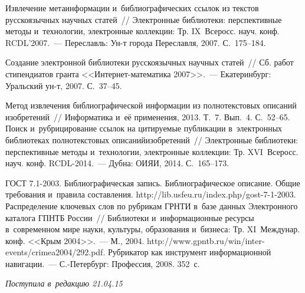 \begin{multicols}{2}
{{\begin{thebibliography}{99}
 Извлечение метаинформации и~библиографических ссылок из текстов русскоязычных научных статей~// Электронные
библиотеки: перспективные методы и~технологии, электронные коллекции: Тр.
IX~Всеросс. науч. конф. RCDL'2007.~--- Переславль: Ун-т города Переславля,
2007. С.~175--184.

 Создание электронной библиотеки
русскоязычных научных статей~// Сб. работ стипендиатов гранта
<<Ин\-тер\-нет-ма\-те\-ма\-ти\-ка 2007>>.~--- Екатеринбург: Уральский ун-т,
2007. С.~37--45.

 Метод извлечения
библиографической информации из полнотекстовых описаний изобретений~//
Информатика и~её применения, 2013. Т.~7. Вып.~4. С.~52--65.
 Поиск и~рубрицирование ссылок на цитируемые
публикации в~электронных библиотеках полнотекстовых описаний\linebreak изобретений~//
Электронные библиотеки: перспективные методы и~технологии, электронные коллекции:
Тр. XVI~Всеросс. науч. конф. RCDL-2014.~--- Дубна: \mbox{ОИЯИ}, 2014. С.~165--173.


ГОСТ 7.1-2003. Библиографическая запись. Библиографическое описание. Общие
требования и~правила составления. {\sf http://lib.usfeu.ru/index.php/gost-7-1-2003}.
 Распределение ключевых слов по руб\-ри\-кам ГРНТИ в~базе данных
Электронного каталога ГПНТБ России~// Библиотеки и~информационные ресурсы в~современном мире науки, культуры, образования и~бизнеса: Тр. XI~Междунар. конф.
<<Крым 2004>>.~--- М., 2004. {\sf http://www.gpntb.ru/win/inter-events/crimea2004/292.pdf}.
 Руб\-ри\-катор как инструмент
информационной навигации.~--- С.-Петербург: Профессия, 2008. 352~с.
 \end{thebibliography}

 }
 }

\end{multicols}

\vspace*{-3pt}

\hfill{\small\textit{Поступила в~редакцию 21.04.15}}

\newpage


